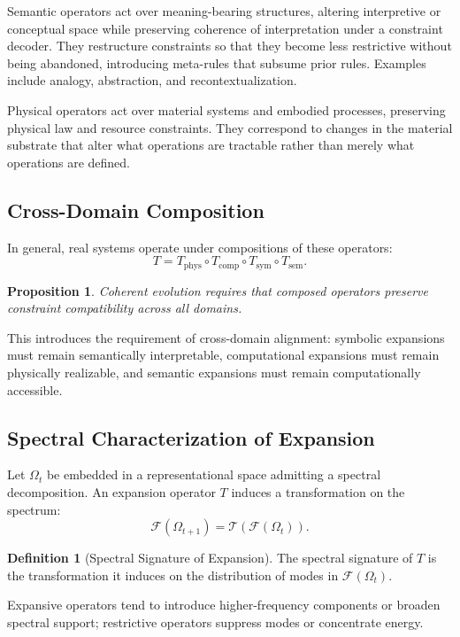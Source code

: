 \documentclass[12pt, a4paper]{article}
\theoremstyle{plain}
\newtheorem{proposition}[theorem]{Proposition}
\theoremstyle{definition}
\newtheorem{definition}[theorem]{Definition}
\theoremstyle{remark}
\begin{document}
Semantic operators act over meaning-bearing structures, altering interpretive or conceptual space while preserving coherence of interpretation under a constraint decoder. They restructure constraints so that they become less restrictive without being abandoned, introducing meta-rules that subsume prior rules. Examples include analogy, abstraction, and recontextualization.

Physical operators act over material systems and embodied processes, preserving physical law and resource constraints. They correspond to changes in the material substrate that alter what operations are tractable rather than merely what operations are defined.

\subsection{Cross-Domain Composition}

In general, real systems operate under compositions of these operators:
\[
T = T_{\mathrm{phys}} \circ T_{\mathrm{comp}} \circ T_{\mathrm{sym}} \circ T_{\mathrm{sem}}.
\]

\begin{proposition}
Coherent evolution requires that composed operators preserve constraint compatibility across all domains.
\end{proposition}

This introduces the requirement of cross-domain alignment: symbolic expansions must remain semantically interpretable, computational expansions must remain physically realizable, and semantic expansions must remain computationally accessible.

\subsection{Spectral Characterization of Expansion}

Let $\Omega_t$ be embedded in a representational space admitting a spectral decomposition. An expansion operator $T$ induces a transformation on the spectrum:
\[
\mathcal{F}(\Omega_{t+1}) = \mathcal{T}(\mathcal{F}(\Omega_t)).
\]

\begin{definition}[Spectral Signature of Expansion]
The spectral signature of $T$ is the transformation it induces on the distribution of modes in $\mathcal{F}(\Omega_t)$.
\end{definition}

Expansive operators tend to introduce higher-frequency components or broaden spectral support; restrictive operators suppress modes or concentrate energy.
\end{document}
